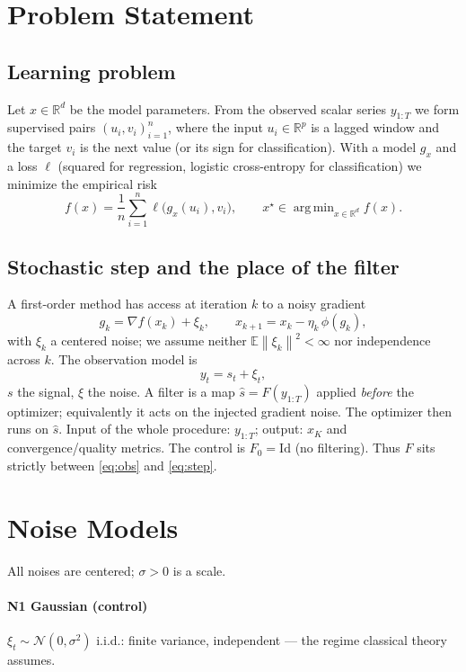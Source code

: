 \documentclass[conference]{IEEEtran}
\newcommand{\R}{\mathbb{R}}
\newcommand{\E}{\mathbb{E}}
\newcommand{\norm}[1]{\left\lVert#1\right\rVert}
\DeclareMathOperator*{\argmin}{arg\,min}
\begin{document}
\section{Problem Statement}

\subsection{Learning problem}
Let $x\in\R^d$ be the model parameters. From the observed scalar series
$y_{1:T}$ we form supervised pairs $(u_i,v_i)_{i=1}^n$, where the input
$u_i\in\R^p$ is a lagged window and the target $v_i$ is the next value
(or its sign for classification). With a model $g_x$ and a loss $\ell$
(squared for regression, logistic cross-entropy for classification) we
minimize the empirical risk
\begin{equation}
f(x)=\frac1n\sum_{i=1}^n \ell\!\big(g_x(u_i),v_i\big),\qquad
x^\star\in\argmin_{x\in\R^d} f(x). \label{eq:risk}
\end{equation}

\subsection{Stochastic step and the place of the filter}
A first-order method has access at iteration $k$ to a noisy gradient
\begin{equation}
g_k=\nabla f(x_k)+\xi_k,\qquad x_{k+1}=x_k-\eta_k\,\phi(g_k),
\label{eq:step}
\end{equation}
with $\xi_k$ a centered noise; we assume neither
$\E\norm{\xi_k}^2<\infty$ nor independence across $k$. The observation
model is
\begin{equation}
y_t=s_t+\xi_t, \label{eq:obs}
\end{equation}
$s$ the signal, $\xi$ the noise. A filter is a map
$\hat s=F(y_{1:T})$ applied \emph{before} the optimizer; equivalently it
acts on the injected gradient noise. The optimizer then runs on
$\hat s$. Input of the whole procedure: $y_{1:T}$; output: $x_K$ and
convergence/quality metrics. The control is $F_0=\mathrm{Id}$ (no
filtering). Thus $F$ sits strictly between \eqref{eq:obs} and
\eqref{eq:step}.

\section{Noise Models}

All noises are centered; $\sigma>0$ is a scale.

\paragraph*{N1 Gaussian (control)}
$\xi_t\sim\mathcal N(0,\sigma^2)$ i.i.d.: finite variance, independent
--- the regime classical theory assumes.
\end{document}
